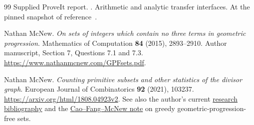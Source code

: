 \begin{thebibliography}{99}
Supplied ProveIt report.
.
Arithmetic and analytic transfer interfaces.
At the pinned snapshot of reference~\cite{priorinventory}.

Nathan McNew.
\emph{On sets of integers which contain no three terms in geometric
progression}. Mathematics of Computation \textbf{84} (2015), 2893--2910.
Author manuscript, Section 7, Questions 7.1 and 7.3.
\url{https://www.nathanmcnew.com/GPFsets.pdf}.

Nathan McNew.
\emph{Counting primitive subsets and other statistics of the divisor graph}.
European Journal of Combinatorics \textbf{92} (2021), 103237.
\url{https://arxiv.org/html/1808.04923v2}.
See also the author's current
\href{https://www.nathanmcnew.com/math.html}{research bibliography}
and the
\href{https://www.nathanmcnew.com/w45.pdf}{Cao--Fang--McNew note}
on greedy geometric-progression-free sets.
\end{thebibliography}
